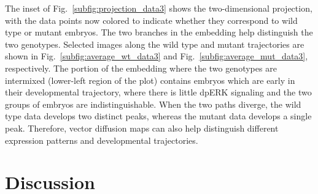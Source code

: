 \documentclass{pnastwo}
\makeatletter
\newcommand{\fig}[0]{Fig.}
\newcommand{\customlabel}[2]{%
\protected@write \@auxout {}{\string \newlabel {#1}{{#2}{}}}}
\makeatother
\begin{document}
\begin{article}
The inset of \fig~\ref{subfig:projection_data3} shows the two-dimensional projection, with the data points now colored to indicate whether they correspond to wild type or mutant embryos.
%
The two branches in the embedding help distinguish the two genotypes.
%
Selected images along the wild type and mutant trajectories are shown in \fig~\ref{subfig:average_wt_data3} and \fig~\ref{subfig:average_mut_data3}, respectively.
%
The portion of the embedding where the two genotypes are intermixed (lower-left region of the plot) contains embryos which are early in their developmental trajectory, where there is little dpERK signaling and the two groups of embryos are indistinguishable. 
%
When the two paths diverge, the wild type data develops two distinct peaks, 
%
%
\noindent whereas the mutant data develops a single peak.
%
Therefore, vector diffusion maps can also help distinguish different expression patterns and developmental trajectories.



\section{Discussion}


\end{article}
\end{document}
